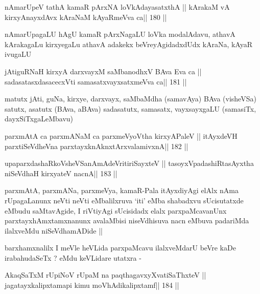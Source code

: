 \begin{shl}
nAmarUpeV tathA kamaR pArxNA loVkAdayasatxthA ||
kArakaM vA kirxyA\s nayxdAvx kAraNaM kAyaRmeVva ca\hfill || 180 ||
\end{shl}

\begin{artha}
nAmarUpagaLU hAgU kamaR pArxNagaLU loVka modalAdavu, athavA kArakagaLu
kirxyegaLu athavA adakekx beVreyAgidadxdUdx kAraNa, kAyaR ivugaLU
\end{artha}

\begin{shl}
jAtiguRNaH kirxyA darxvayxM saMbanodhxV BAva Eva ca ||
sadasatasxdasacecxVti samasatxvayxsatxmeVva ca\hfill || 181 ||
\end{shl}

\begin{artha}
matutx jAti, guNa, kirxye, darxvayx, saMbaMdha (samavAya) BAva
(visheVSa) satutx, asatutx (BAva, aBAva) sadasatutx, samasatx,
vayxsayxgaLU (samasiTx, dayxSiTxgaLeMbavu)
\end{artha}

\begin{shl}
parxmAtA ca parxmANaM ca parxmeVyoV\s tha kirxyAPaleV ||
itAyxdeVH parxtiSeVdheVna parxtayxknAknxtArxvalamivxnA\hfill || 182 ||
\end{shl}

\begin{shl}
upaparxdashaRkoV\s sheVSanAmAdeVritiriSayxteV ||
tasoyxVpadashiRtasAyxtha niSeVdhaH kirxyateV nacnA\hfill || 183 ||
\end{shl}

\begin{artha}
parxmAtA, parxmANa, parxmeVya, kamaR-Pala itAyxdiyAgi elAlx nAma
rUpagaLanunx neVti neVti eMbalilxruva `iti' eMba shabadxvu
sUcisutatxde eMbudu saMtavAgide, I riVtiyAgi sUcisidadx elalx
parxpaMcavanUnx parxtayxhAmxtamxnanunx avalaMbisi niseVdhisuva nacn
eMbuva padariMda ilalxveMdu niSeVdhamADide ||
\end{artha}

\begin{artha}
barxhamxnalilx I meVle heVLida parxpaMcavu ilalxveMdarU beVre kaDe
irabahudaSeTx ? eMdu keVLidare utatxra -
\end{artha}

\begin{shl}
AkaqSaTxM rUpiNoV rUpaM na paqthagavxyXvatiSaThxteV ||
jagatayxkalipxtamapi kimu moVhAdikalipxtamf\hfill || 184 ||
\end{shl}

